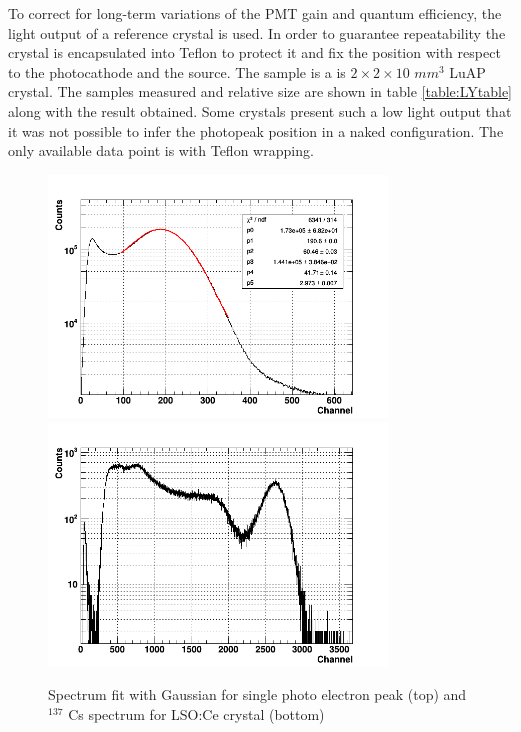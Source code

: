 To correct for long-term variations of the PMT gain and quantum efficiency, the light output of a reference crystal is used. In order to guarantee repeatability the crystal is encapsulated into Teflon to protect it and fix the position with respect to the photocathode and the source. The sample is a is $2\times 2\times 10$ $mm^{3}$ LuAP crystal.
The samples measured and relative size are shown in table \ref{table:LYtable} along with the result obtained. Some crystals present such a low light output that it was not possible to infer the photopeak position in a naked configuration. The only available data point is with Teflon wrapping.

\begin{figure}
\begin{center}
\includegraphics[width=9cm]{../Pictures/Chapter_5/single.png}
\includegraphics[width=9cm]{../Pictures/Chapter_5/spectrum_LY.png}
\end{center}
\caption[Single electron and LSO $^{137}$ Cs spectrum]{Spectrum fit with Gaussian for single photo electron peak (top) and $^{137}$ Cs spectrum for LSO:Ce crystal (bottom)}
\label{fig:spectrum}
\end{figure}

